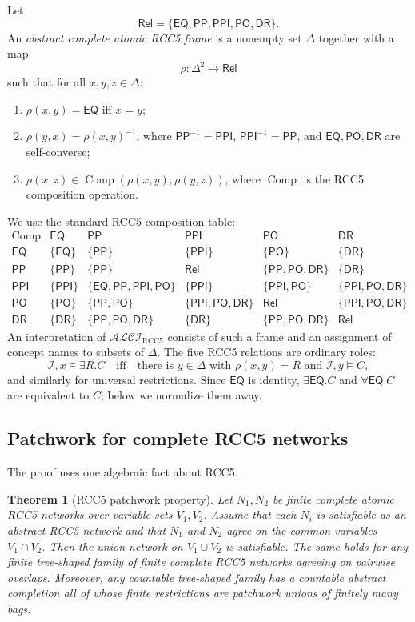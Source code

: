 \documentclass[11pt]{article}
\newtheorem{theorem}{Theorem}[section]
\newcommand{\RCC}{\mathrm{RCC5}}
\newcommand{\Rel}{\mathsf{Rel}}
\newcommand{\EQ}{\mathsf{EQ}}
\newcommand{\PP}{\mathsf{PP}}
\newcommand{\PPI}{\mathsf{PPI}}
\newcommand{\PO}{\mathsf{PO}}
\newcommand{\DR}{\mathsf{DR}}
\newcommand{\Comp}{\operatorname{Comp}}
\newcommand{\calI}{\mathcal I}
\begin{document}
Let
\[
\Rel=\{\EQ,\PP,\PPI,\PO,\DR\}.
\]
An \emph{abstract complete atomic RCC5 frame} is a nonempty set $\Delta$ together with a
map
\[
\rho:\Delta^2\to \Rel
\]
such that for all $x,y,z\in\Delta$:
\begin{enumerate}[label=(R\arabic*)]
\item $\rho(x,y)=\EQ$ iff $x=y$;
\item $\rho(y,x)=\rho(x,y)^{-1}$, where $\PP^{-1}=\PPI$, $\PPI^{-1}=\PP$, and
$\EQ,\PO,\DR$ are self-converse;
\item $\rho(x,z)\in\Comp(\rho(x,y),\rho(y,z))$, where $\Comp$ is the RCC5 composition
operation.
\end{enumerate}
We use the standard RCC5 composition table:
\[
\begin{array}{c|ccccc}
\Comp & \EQ & \PP & \PPI & \PO & \DR\\\hline
\EQ & \{\EQ\} & \{\PP\} & \{\PPI\} & \{\PO\} & \{\DR\}\\
\PP & \{\PP\} & \{\PP\} & \Rel & \{\PP,\PO,\DR\} & \{\DR\}\\
\PPI & \{\PPI\} & \{\EQ,\PP,\PPI,\PO\} & \{\PPI\} & \{\PPI,\PO\} & \{\PPI,\PO,\DR\}\\
\PO & \{\PO\} & \{\PP,\PO\} & \{\PPI,\PO,\DR\} & \Rel & \{\PPI,\PO,\DR\}\\
\DR & \{\DR\} & \{\PP,\PO,\DR\} & \{\DR\} & \{\PP,\PO,\DR\} & \Rel
\end{array}
\]
An interpretation of $\mathcal{ALCI}_{\RCC}$ consists of such a frame and an assignment of
concept names to subsets of $\Delta$.  The five RCC5 relations are ordinary roles:
\[
\calI,x\models \exists R.C\quad\text{iff}\quad
\text{there is }y\in\Delta\text{ with }\rho(x,y)=R\text{ and }\calI,y\models C,
\]
and similarly for universal restrictions.  Since $\EQ$ is identity, $\exists\EQ.C$ and
$\forall\EQ.C$ are equivalent to $C$; below we normalize them away.

\subsection{Patchwork for complete RCC5 networks}

The proof uses one algebraic fact about RCC5.

\begin{theorem}[RCC5 patchwork property]\label{thm:patchwork}
Let $N_1,N_2$ be finite complete atomic RCC5 networks over variable sets $V_1,V_2$.
Assume that each $N_i$ is satisfiable as an abstract RCC5 network and that $N_1$ and
$N_2$ agree on the common variables $V_1\cap V_2$.  Then the union network on
$V_1\cup V_2$ is satisfiable.  The same holds for any finite tree-shaped family of
finite complete RCC5 networks agreeing on pairwise overlaps.  Moreover, any countable
tree-shaped family has a countable abstract completion all of whose finite restrictions
are patchwork unions of finitely many bags.
\end{theorem}
\end{document}
